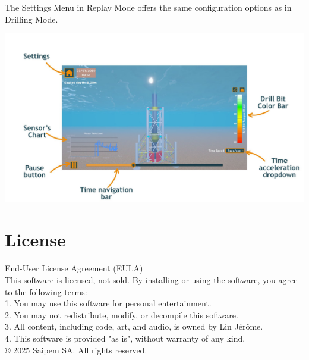 \documentclass{article}
\begin{document}
The Settings Menu in Replay Mode offers the same configuration options as in Drilling Mode.
\begin{center}
    \includegraphics[width=6in]{ReplayMode.jpg}
\end{center}






\section{License}
End-User License Agreement (EULA)\\
\newline
\noindent This software is licensed, not sold. By installing or using the software, you agree to the following terms:\\
1. You may use this software for personal entertainment.\\
2. You may not redistribute, modify, or decompile this software.\\
3. All content, including code, art, and audio, is owned by Lin Jérôme.\\
4. This software is provided "as is", without warranty of any kind.\\
\newline
\noindent © 2025 Saipem SA. All rights reserved.
\end{document}
